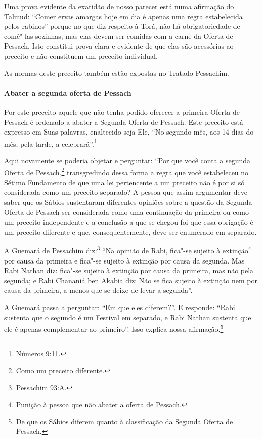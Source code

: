 \begin{multicols}{2}
Uma prova evidente da exatidão de nosso parecer está numa afirmação do
Talmud\starr: ``Comer ervas amargas hoje em dia é apenas uma regra
estabelecida pelos rabinos'' porque no que diz respeito à Torá\starr, não há
obrigatoriedade de comê"-las sozinhas, mas elas devem ser comidas com a
carne da Oferta de Pessach\starr. Isto constitui prova clara e evidente de
que elas são acessórias ao preceito e não constituem um preceito
individual.

As normas deste preceito também estão expostas no Tratado Pessachim\starr.

\paragraph{Abater a segunda oferta de Pessach\starr{}}

Por este preceito aquele que não tenha podido oferecer a primeira Oferta
de Pessach\starr{} é ordenado a abater a Segunda Oferta de Pessach\starr. Este
preceito está expresso em Suas palavras, enaltecido seja Ele, ``No
segundo mês, aos 14 dias do mês, pela tarde, a celebrará''.\footnote{Números
9:11.}

Aqui novamente se poderia objetar e perguntar: ``Por que você conta a segunda Oferta de Pessach\starr,\footnote{Como um preceito diferente.} transgredindo dessa forma a regra que você estabeleceu no Sétimo Fundamento de que uma lei pertencente a um
preceito não é por si só considerada como um preceito separado? A pessoa que
assim argumentar deve saber que os Sábios sustentaram diferentes
opiniões sobre a questão da Segunda Oferta de Pessach\starr{} ser considerada
como uma continuação da primeira ou como um preceito independente e a
conclusão a que se chegou foi que essa obrigação é um preceito
diferente e que, consequentemente, deve ser enumerado em separado.

A Guemará\starr{} de Pessachim\starr{} diz:\footnote{Pessachim\starr{} 93:A.} ``Na opinião de Rabi,
fica"-se sujeito à extinção\footnote{Punição à pessoa que não abater a oferta de Pessach\starr.} por causa da primeira e fica"-se sujeito
à extinção por causa da segunda. Mas Rabi Nathan\starr{} diz: fica"-se sujeito à
extinção por causa da primeira,
mas não pela segunda; e Rabi Chananiá ben Akabia\starr{} diz: Não se fica sujeito
à extinção nem por causa da primeira, a menos que se deixe de levar a
segunda''.

A Guemará\starr{} passa a perguntar: ``Em que eles diferem?''. E responde:
``Rabi sustenta que o segundo é um Festival em separado, e Rabi Nathan\starr{}
sustenta que ele é apenas complementar ao primeiro''. Isso explica nossa
afirmação.\footnote{De que os Sábios diferem quanto à classificação da Segunda Oferta de
  Pessach\starr.}


\end{multicols}
